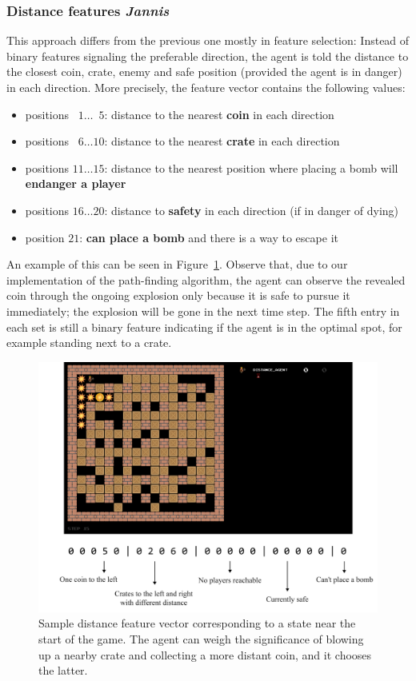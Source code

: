 \documentclass{article}
\begin{document}
\clearpage

\subsubsection[Distance features]{Distance features {\normalsize \normalfont \it \hfill Jannis}}

This approach differs from the previous one mostly in feature selection: Instead of binary features signaling the preferable direction, the agent is told the distance to the closest coin, crate, enemy and safe position (provided the agent is in danger) in each direction. More precisely, the feature vector contains the following values:

\begin{itemize}
    \item positions $\phantom{0}1 \ldots \phantom{0}5$: distance to the nearest \textbf{coin} in each direction
    \item positions $\phantom{0}6 \ldots 10$: distance to the nearest \textbf{crate} in each direction
    \item positions $11 \ldots 15$: distance to the nearest position where placing a bomb will \textbf{endanger a player}
    \item positions $16 \ldots 20$: distance to \textbf{safety} in each direction (if in danger of dying)
    \item position\phantom{s} $21$: \textbf{can place a bomb} and there is a way to escape it
\end{itemize}

An example of this can be seen in Figure~\ref{fig:distance-vector}. Observe that, due to our implementation of the path-finding algorithm, the agent can observe the revealed coin through the ongoing explosion only because it is safe to pursue it immediately; the explosion will be gone in the next time step. The fifth entry in each set is still a binary feature indicating if the agent is in the optimal spot, for example standing next to a crate.\par

\begin{figure}[h]
    \centering
    \includegraphics[width=.8\linewidth]{figures/distance-vector.png}
    \caption{Sample distance feature vector corresponding to a state near the start of the game. The agent can weigh the significance of blowing up a nearby crate and collecting a more distant coin, and it chooses the latter.}
    \label{fig:distance-vector}
\end{figure}
\end{document}
